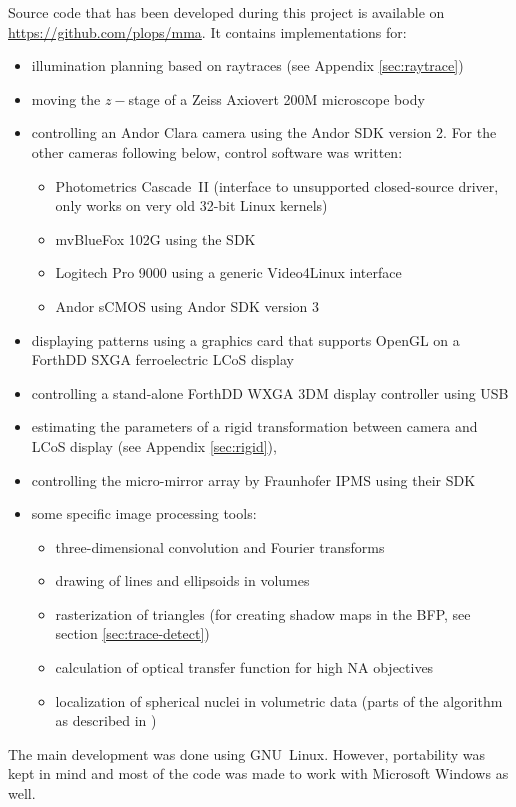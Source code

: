 \documentclass[oneside,a4paper,12pt,BCOR20mm,DIV14]{scrbook} %
\begin{document}
Source code that has been developed during this project is available
on \url{https://github.com/plops/mma}.  It contains implementations
for:
\begin{itemize}
\item illumination planning based on raytraces (see Appendix
  \ref{sec:raytrace})
\item moving the $z-$stage of a Zeiss Axiovert 200M microscope body
\item controlling an Andor Clara camera using the Andor SDK version
  2. For the other cameras following below, control software was written:
  \begin{itemize}
  \item Photometrics Cascade~II (interface to unsupported
    closed-source driver, only works on very old 32-bit Linux kernels)
  \item mvBlueFox 102G using the SDK
  \item Logitech Pro 9000 using a generic Video4Linux interface
  \item Andor sCMOS using Andor SDK version 3
  \end{itemize}
\item displaying patterns using a graphics card that supports OpenGL
  on a ForthDD SXGA ferroelectric LCoS display
\item controlling a stand-alone ForthDD WXGA 3DM display controller
  using USB
\item estimating the parameters of a rigid transformation between
  camera and LCoS display (see Appendix \ref{sec:rigid}),
\item controlling the micro-mirror array by Fraunhofer IPMS using
  their SDK
\item some specific image processing tools:
  \begin{itemize}
  \item three-dimensional convolution and Fourier transforms
  \item drawing of lines and ellipsoids in volumes
  \item rasterization of triangles (for creating shadow maps in the
    BFP, see section \ref{sec:trace-detect})
  \item calculation of optical transfer function for high NA
    objectives
  \item localization of spherical nuclei in volumetric data (parts of
    the algorithm as described in \citet{Santella2010})
  \end{itemize}
\end{itemize}
The main development was done using GNU~Linux. However, portability
was kept in mind and most of the code was made to work with Microsoft
Windows as well.
\end{document}
